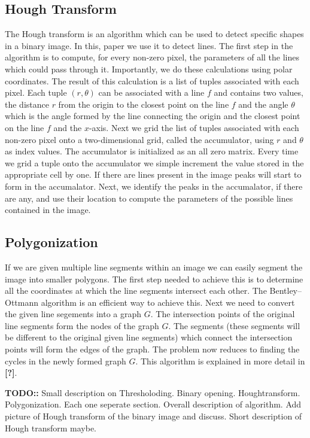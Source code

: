 \documentclass{article}
\begin{document}
\subsection{Hough Transform}
The Hough transform is an algorithm which can be used to detect specific shapes in a binary image. In this, paper we use it to detect lines. 
The first step in the algorithm is to compute, for every non-zero pixel, the parameters of all the lines which could pass through it. Importantly, we do these calculations using polar coordinates. 
The result of this calculation is a list of tuples associated with each pixel. Each tuple $(r,\theta)$ can be associated with a line $f$ and contains two values, 
the distance $r$ from the origin to the closest point on the line $f$ and the angle $\theta$ which is the angle formed by the line 
connecting the origin and the closest point on the line $f$ and the $x$-axis. Next we grid the list of tuples associated with each non-zero pixel onto a two-dimensional 
grid, called the accumulator, using $r$ and $\theta$ as index values. The accumulator is initialized as an all zero matrix. Every time we grid a tuple onto the accumulator 
we simple increment the value stored in the appropriate cell by one. If there are lines present in the image peaks will start to form in the accumalator. Next, we 
identify the peaks in the accumalator, if there are any, and use their location to compute the parameters of the possible lines contained in the image. 

\subsection{Polygonization}
If we are given multiple line segments within an image we can easily segment the image into smaller polygons. The first step needed to achieve this is to determine 
all the coordinates at which the line segments intersect each other. The Bentley–Ottmann algorithm is an efficient way to achieve this. Next we need to convert the given line 
segements into a graph $G$. The intersection points of the original line segments form the nodes of the graph $G$. The segments (these segments will be different to the original given line segments)
which connect the intersection points will form the edges of the graph. The problem now reduces to finding the cycles in the newly formed graph $G$. This algorithm is explained in more detail in \textbf{[?]}.


 \textbf{TODO::} Small description on Thresholoding. Binary opening. Houghtransform. Polygonization. Each one seperate section. Overall description of algorithm. Add picture of Hough 
 transform of the binary image and discuss. Short description of Hough transform maybe. 
 
\end{document}
